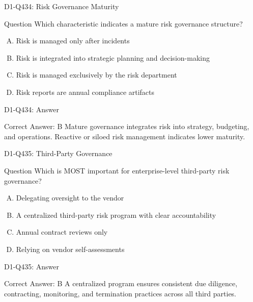 \documentclass{beamer}
\begin{document}
\begin{frame}{D1-Q434: Risk Governance Maturity}
	\begin{block}{Question}
		Which characteristic indicates a mature risk governance structure?
	\end{block}
	\begin{enumerate}[(A)]
		\item Risk is managed only after incidents
		\item Risk is integrated into strategic planning and decision-making
		\item Risk is managed exclusively by the risk department
		\item Risk reports are annual compliance artifacts
	\end{enumerate}
\end{frame}
\begin{frame}{D1-Q434: Answer}
	\begin{block}{Correct Answer: B}
		Mature governance integrates risk into strategy, budgeting, and operations. Reactive or siloed risk management indicates lower maturity.
	\end{block}
\end{frame}

\begin{frame}{D1-Q435: Third-Party Governance}
	\begin{block}{Question}
		Which is MOST important for enterprise-level third-party risk governance?
	\end{block}
	\begin{enumerate}[(A)]
		\item Delegating oversight to the vendor
		\item A centralized third-party risk program with clear accountability
		\item Annual contract reviews only
		\item Relying on vendor self-assessments
	\end{enumerate}
\end{frame}
\begin{frame}{D1-Q435: Answer}
	\begin{block}{Correct Answer: B}
		A centralized program ensures consistent due diligence, contracting, monitoring, and termination practices across all third parties.
	\end{block}
\end{frame}
\end{document}
